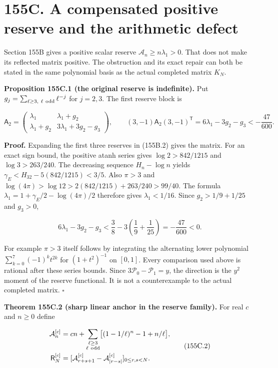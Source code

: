 \documentclass[
  11pt,
]{book}
\begin{document}
\section{155C. A compensated positive reserve and the arithmetic
defect}\label{c.-a-compensated-positive-reserve-and-the-arithmetic-defect}

Section 155B gives a positive scalar reserve
\(\mathcal A_n\ge n\lambda_1>0\). That does not make its reflected
matrix positive. The obstruction and its exact repair can both be stated
in the same polynomial basis as the actual completed matrix \(K_N\).

\textbf{Proposition 155C.1 (the original reserve is indefinite).} Put
\(g_j=\sum_{\ell\ge3,\ \ell\ {\rm odd}}\ell^{-j}\) for \(j=2,3\). The
first reserve block is

\[
\mathsf A_2=
\begin{pmatrix}
\lambda_1&\lambda_1+g_2\\
\lambda_1+g_2&3\lambda_1+3g_2-g_3
\end{pmatrix},\qquad
(3,-1)\mathsf A_2(3,-1)^{\mathsf T}
=6\lambda_1-3g_2-g_3<-\frac{47}{600}.
\tag{155C.1}
\]

\textbf{Proof.} Expanding the first three reserves in (155B.2) gives the
matrix. For an exact sign bound, the positive atanh series gives
\(\log2>842/1215\) and \(\log3>263/240\). The decreasing sequence
\(H_n-\log n\) yields \(\gamma_E<H_{32}-5(842/1215)<3/5\). Also
\(\pi>3\) and \(\log(4\pi)>\log12>2(842/1215)+263/240>99/40\). The
formula \(\lambda_1=1+\gamma_E/2-\log(4\pi)/2\) therefore gives
\(\lambda_1<1/16\). Since \(g_2>1/9+1/25\) and \(g_3>0\),

\[
6\lambda_1-3g_2-g_3<\frac38-3\left(\frac19+\frac1{25}\right)
=-\frac{47}{600}<0.
\]

For example \(\pi>3\) itself follows by integrating the alternating
lower polynomial \(\sum_{k=0}^7(-1)^kt^{2k}\) for \((1+t^2)^{-1}\) on
\([0,1]\). Every comparison used above is rational after these series
bounds. Since \(3\mathcal P_0-\mathcal P_1=y\), the direction is the
\(y^2\) moment of the reserve functional. It is not a counterexample to
the actual completed matrix. \(\square\)

\textbf{Theorem 155C.2 (sharp linear anchor in the reserve family).} For
real \(c\) and \(n\ge0\) define

\[
\begin{aligned}
\mathcal A_n^{[c]}&=cn+
 \sum_{\substack{\ell\ge3\\\ell\ {\rm odd}}}
 \bigl[(1-1/\ell)^n-1+n/\ell\bigr],\\
\mathsf R_N^{[c]}&=
 [\mathcal A_{r+s+1}^{[c]}-\mathcal A_{|r-s|}^{[c]}]_{0\le r,s<N}.
\end{aligned}
\tag{155C.2}
\]
\end{document}
